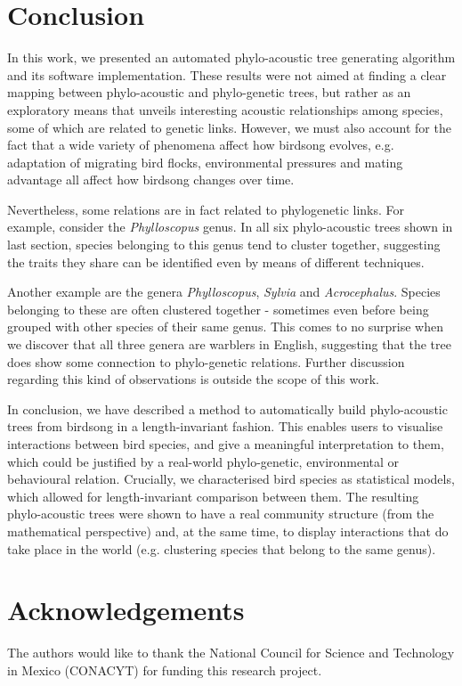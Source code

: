 \documentclass[pdftex,11pt,a4paper]{article}
\theoremstyle{definition}
\theoremstyle{remark}
\begin{document}
\section{Conclusion}
\label{section_conclusion}
In this work, we presented an automated phylo-acoustic tree generating algorithm and its software implementation. These results were not aimed at finding a clear mapping between phylo-acoustic and phylo-genetic trees, but rather as an exploratory means that unveils interesting acoustic relationships among species, some of which are related to genetic links. However, we must also account for the fact that a wide variety of phenomena affect how birdsong evolves, e.g. adaptation of migrating bird flocks, environmental pressures and mating advantage all affect how birdsong changes over time. 
\par Nevertheless, some relations are in fact related to phylogenetic links. For example, consider the \emph{Phylloscopus} genus. In all six phylo-acoustic trees shown in last section, species belonging to this genus tend to cluster together, suggesting the traits they share can be identified even by means of different techniques.
\par Another example are the genera \emph{Phylloscopus}, \emph{Sylvia} and \emph{Acrocephalus}. Species belonging to these are often clustered together - sometimes even before being grouped with other species of their same genus. This comes to no surprise when we discover that all three genera are warblers in English, suggesting that the tree does show some connection to phylo-genetic relations. Further discussion regarding this kind of observations is outside the scope of this work.
\par In conclusion, we have described a method to automatically build phylo-acoustic trees from birdsong in a length-invariant fashion. This enables users to visualise interactions between bird species, and give a meaningful interpretation to them, which could be justified by a real-world phylo-genetic, environmental or behavioural relation. Crucially, we characterised bird species as statistical models, which allowed for length-invariant comparison between them. The resulting phylo-acoustic trees were shown to have a real community structure (from the mathematical perspective) and, at the same time, to display interactions that do take place in the world (e.g. clustering species that belong to the same genus).

\section*{Acknowledgements}
The authors would like to thank the National Council for Science and Technology in Mexico (CONACYT) for funding this research project. 




\end{document}
